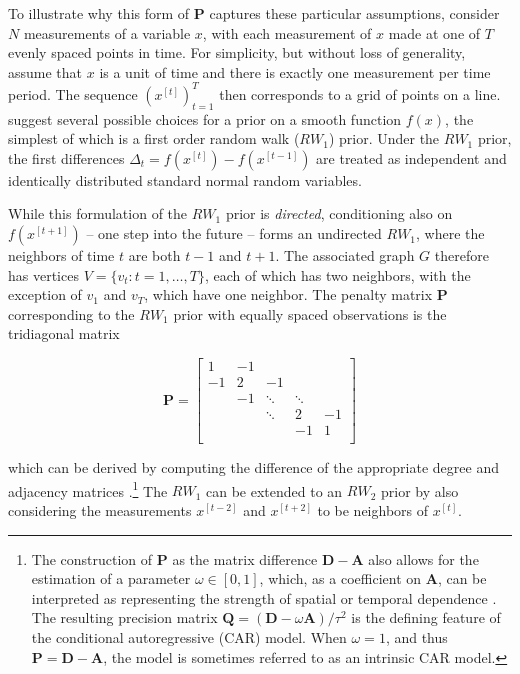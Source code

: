 To illustrate why this form of $\mathbf{P}$ captures these particular assumptions, consider $N$ measurements of a variable $x$, with each measurement of $x$ made at one of $T$ evenly spaced points in time. For simplicity, but without loss of generality,  assume that $x$ is a unit of time and there is exactly one measurement per time period.  The sequence $(x^{[t]})_{t=1}^T$ then corresponds to a grid of points on a line.   suggest several possible choices for a prior on a smooth function $f(x)$, the simplest of which is a first order random walk ($RW_1$) prior.  Under the $RW_1$ prior, the first differences $\Delta_t = f(x^{[t]}) - f(x^{[t-1]})$ are treated as independent and identically distributed standard normal random variables. 

While this formulation of the $RW_1$ prior is {\it directed}, conditioning also on $f(x^{[t+1]})$ -- one step into the future -- forms an undirected $RW_1$, where the neighbors of time $t$ are both $t-1$ and $t+1$.  The associated graph $G$ therefore has vertices $V=\{v_t : t=1,\dots,T\}$, each of which has two neighbors, with the exception of $v_1$ and $v_T$, which have one neighbor. The penalty matrix $\mathbf{P}$ corresponding to the $RW_1$ prior with equally spaced observations is the tridiagonal matrix

\begin{equation*}
\mathbf{P} = 
\begin{bmatrix}
1  	& -1 	& 		& 	& \\
-1  	& 2 	& -1 		& 	& \\
  	& -1 	& \ddots 	& \ddots	& \\
  	&  	& \ddots 	& 2 	& -1\\
  	&  	& 		& -1 	& 1\\
\end{bmatrix}
\end{equation*}

\noindent which can be derived by computing the difference of the appropriate degree and adjacency matrices .\footnote{The construction of $\mathbf{P}$ as the matrix difference $\mathbf{D} - \mathbf{A}$ also allows for the estimation of a parameter $\omega \in [0,1]$, which, as a coefficient on $\mathbf{A}$, can be interpreted as representing the strength of spatial or temporal dependence . The resulting precision matrix $\mathbf{Q}= (\mathbf{D} - \omega \mathbf{A})/\tau^2$ is the defining feature of the conditional autoregressive (CAR) model.  When $\omega = 1$, and thus $\mathbf{P}= \mathbf{D} - \mathbf{A}$, the model is sometimes referred to as an intrinsic CAR model.
} The $RW_1$  can be extended to an $RW_2$ prior by also considering the measurements $x^{[t-2]}$  and $x^{[t+2]}$ to be neighbors of $x^{[t]}$. 


